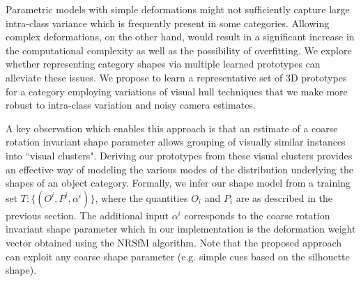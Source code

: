 
Parametric models with simple deformations might not sufficiently capture large intra-class variance which is frequently present in some categories. Allowing complex deformations, on the other hand, would result in a significant increase in the computational complexity as well as the possibility of overfitting. We explore whether representing category shapes via multiple learned prototypes can alleviate these issues. We propose to learn a representative set of 3D prototypes for a category employing variations of visual hull techniques that we make more robust to intra-class variation and noisy camera estimates.

A key observation which enables this approach is that an estimate of a coarse rotation invariant shape parameter allows grouping of visually similar instances into ``visual clusters". Deriving our prototypes from these visual clusters provides an effective way of modeling the various modes of the distribution underlying the shapes of an object category. Formally, we infer our shape model from a training set $T:\{(O^i,P^i,\alpha^i)\}$, where the quantities $O_i$ and $P_i$ are as described in the previous section. The additional input $\alpha^i$ corresponds to the coarse rotation invariant shape parameter which in our implementation is the deformation weight vector obtained using the NRSfM algorithm. Note that the proposed approach can exploit any coarse shape parameter (e.g. simple cues based on the silhouette shape).

